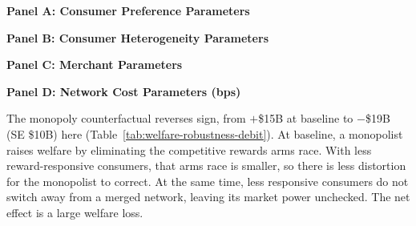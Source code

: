 \documentclass[main.tex]{subfiles}
\begin{document}
\begin{table}[ht!]
    \small
    \caption{Estimated parameters: Lower reward sensitivity}
    \label{tab:param-robustness-debit}
\begin{center}\setlength{\tabcolsep}{4pt} \begin{minipage}[t]{0.5\columnwidth}%
\centering \textbf{Panel A: Consumer Preference Parameters} \par\medskip 
\end{minipage}%
\begin{minipage}[t]{0.5\columnwidth}%
\centering \textbf{Panel B: Consumer Heterogeneity Parameters} \par\medskip 
\end{minipage}

\vspace{0.5em}

\begin{minipage}[t]{0.5\columnwidth}%
\centering \textbf{Panel C: Merchant Parameters} \par\medskip 
\end{minipage}%
\begin{minipage}[t]{0.5\columnwidth}%
\centering \textbf{Panel D: Network Cost Parameters (bps)} \par\medskip 
\end{minipage}
\end{center}
\end{table}

The monopoly counterfactual reverses sign, from $+$\$15B at baseline to $-$\$19B (SE \$10B) here (Table~\ref{tab:welfare-robustness-debit}).
At baseline, a monopolist raises welfare by eliminating the competitive rewards arms race.
With less reward-responsive consumers, that arms race is smaller, so there is less distortion for the monopolist to correct.
At the same time, less responsive consumers do not switch away from a merged network, leaving its market power unchecked.
The net effect is a large welfare loss.
\end{document}
